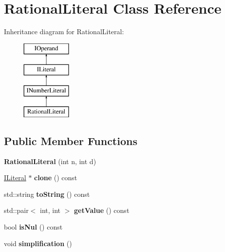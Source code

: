 \hypertarget{class_rational_literal}{}\section{Rational\+Literal Class Reference}
\label{class_rational_literal}
Inheritance diagram for Rational\+Literal\+:\begin{figure}[H]
\begin{center}
\leavevmode
\includegraphics[height=4.000000cm]{class_rational_literal}
\end{center}
\end{figure}
\subsection*{Public Member Functions}
\begin{DoxyCompactItemize}
\item 
{\bfseries Rational\+Literal} (int n, int d)\hypertarget{class_rational_literal_ad1b8fb17502db786b0cd312cff4a09be}{}\label{class_rational_literal_ad1b8fb17502db786b0cd312cff4a09be}

\item 
\hyperlink{class_i_literal}{I\+Literal} $\ast$ {\bfseries clone} () const \hypertarget{class_rational_literal_a97aacce9bff257cf0f7f4c00b44d7b2d}{}\label{class_rational_literal_a97aacce9bff257cf0f7f4c00b44d7b2d}

\item 
std\+::string {\bfseries to\+String} () const \hypertarget{class_rational_literal_a01070beda18817a378bb812bc4f42cee}{}\label{class_rational_literal_a01070beda18817a378bb812bc4f42cee}

\item 
std\+::pair$<$ int, int $>$ {\bfseries get\+Value} () const \hypertarget{class_rational_literal_a8766c82f506ecfe9521e272118018221}{}\label{class_rational_literal_a8766c82f506ecfe9521e272118018221}

\item 
bool {\bfseries is\+Nul} () const \hypertarget{class_rational_literal_a805309020b4c177da25f0e76db3ee6a6}{}\label{class_rational_literal_a805309020b4c177da25f0e76db3ee6a6}

\item 
void {\bfseries simplification} ()\hypertarget{class_rational_literal_a8b39e77812d1cd9815b11ca94e2a77ef}{}\label{class_rational_literal_a8b39e77812d1cd9815b11ca94e2a77ef}

\end{DoxyCompactItemize}
